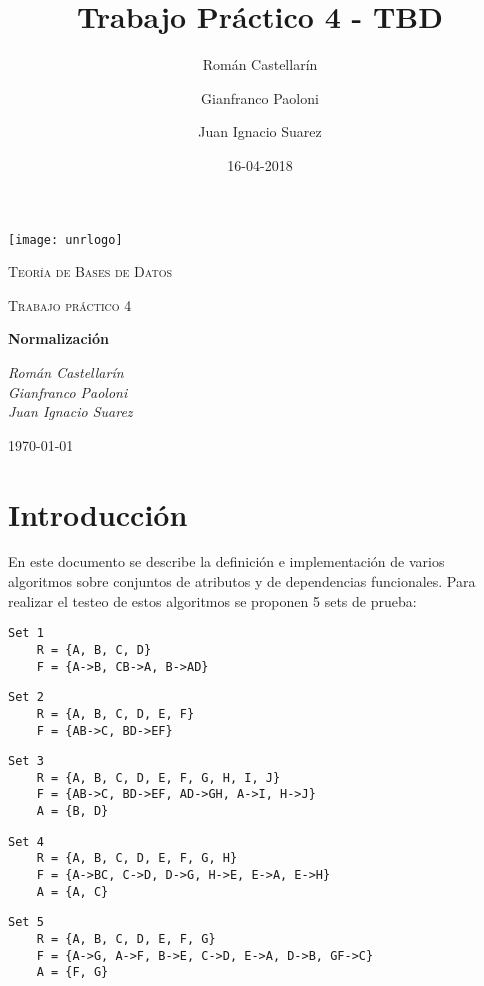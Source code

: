 \documentclass{article}
\title{Trabajo Práctico 4 - TBD}
\date{16-04-2018}
\author{
    Román Castellarín\\
    \and
    Gianfranco Paoloni\\
    \and
    Juan Ignacio Suarez
}
\begin{document}
\begin{titlepage}
    \centering
    \texttt{[image: unrlogo]}\par\vspace{1cm}
    {\scshape\LARGE Teoría de Bases de Datos \par}
    {\scshape\Large Trabajo práctico 4\par}
    \vspace{1.5cm}
    {\huge\bfseries Normalización \par}
    \vspace{2cm}
    {\Large\itshape  Román Castellarín \\
                     Gianfranco Paoloni \\
                     Juan Ignacio Suarez \par}
    \vfill

    {\large \today \par}
\end{titlepage}

\tableofcontents

\newpage
\section{Introducción}
En este documento se describe la definición e implementación de varios algoritmos sobre conjuntos de atributos y de dependencias funcionales. Para realizar el testeo de estos algoritmos se proponen 5 sets de prueba:

\begin{Verbatim}[frame=single]
    Set 1
    R = {A, B, C, D}
    F = {A->B, CB->A, B->AD}
\end{Verbatim}

\begin{Verbatim}[frame=single]
    Set 2
    R = {A, B, C, D, E, F}
    F = {AB->C, BD->EF}
\end{Verbatim}

\begin{Verbatim}[frame=single]
    Set 3
    R = {A, B, C, D, E, F, G, H, I, J}
    F = {AB->C, BD->EF, AD->GH, A->I, H->J}
    A = {B, D}
\end{Verbatim}

\begin{Verbatim}[frame=single]
    Set 4
    R = {A, B, C, D, E, F, G, H}
    F = {A->BC, C->D, D->G, H->E, E->A, E->H}
    A = {A, C}
\end{Verbatim}

\begin{Verbatim}[frame=single]
    Set 5
    R = {A, B, C, D, E, F, G}
    F = {A->G, A->F, B->E, C->D, E->A, D->B, GF->C}
    A = {F, G}
\end{Verbatim}
\end{document}
